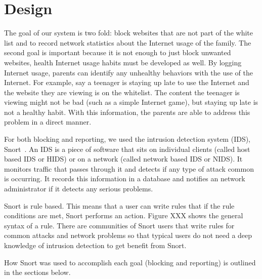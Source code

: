
\section{Design}

The goal of our system is two fold: block websites that are not part of the
white list and to record network statistics about the Internet usage of the
family. The second goal is important because it is not enough to just block
unwanted websites, health Internet usage habits must be developed as well. By
logging Internet usage, parents can identify any unhealthy behaviors with the
use of the Internet. For example, say a teenager is staying up late to use the
Internet and the website they are viewing is on the whitelist. The content the
teenager is viewing might not be bad (such as a simple Internet game), but
staying up late is not a healthy habit. With this information, the parents are
able to address this problem in a direct manner.

For both blocking and reporting, we used the intrusion detection system (IDS),
Snort~\cite{snort}. An IDS is a piece of software that sits on individual
clients (called host based IDS or HIDS) or on a network (called network based
IDS or NIDS). It monitors traffic that passes through it and detects if any
type of attack common is occurring. It records this information in a database
and notifies an network administrator if it detects any serious problems.

Snort is rule based. This means that a user can write rules that if the rule
conditions are met, Snort performs an action. Figure XXX shows the general
syntax of a rule. There are communities of Snort users that write rules for
common attacks and network problems so that typical users do not need a deep
knowledge of intrusion detection to get benefit from Snort.


How Snort was used to accomplish each goal (blocking and reporting) is outlined
in the sections below.

